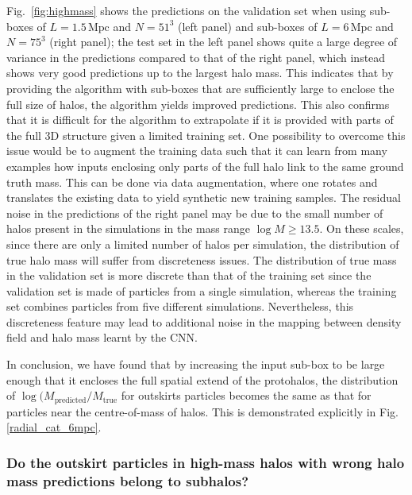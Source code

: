 \documentclass[11pt]{article}
\begin{document}
Fig.~\ref{fig:highmass} shows the predictions on the validation set when using sub-boxes of $L=1.5\, \mathrm{Mpc}$ and $N=51^3$ (left panel) and sub-boxes of $L=6\, \mathrm{Mpc}$ and $N=75^3$ (right panel); the test set in the left panel shows quite a large degree of variance in the predictions compared to that of the right panel, which instead shows very good predictions up to the largest halo mass. This indicates that by providing the algorithm with sub-boxes that are sufficiently large to enclose the full size of halos, the algorithm yields improved predictions. This also confirms that it is difficult for the algorithm to extrapolate if it is provided with parts of the full 3D structure given a limited training set. One possibility to overcome this issue would be to augment the training data such that it can learn from many examples how inputs enclosing only parts of the full halo link to the same ground truth mass. This can be done via data augmentation, where one rotates and translates the existing data to yield synthetic new training samples. The residual noise in the predictions of the right panel may be due to the small number of halos present in the simulations in the mass range $\log M \geq 13.5$. On these scales, since there are only a limited number of halos per simulation, the distribution of true halo mass will suffer from discreteness issues. The distribution of true mass in the validation set is more discrete than that of the training set since the validation set is made of particles from a single simulation, whereas the training set combines particles from five different simulations. Nevertheless, this discreteness feature may lead to additional noise in the mapping between density field and halo mass learnt by the CNN.

In conclusion, we have found that by increasing the input sub-box to be large enough that it encloses the full spatial extend of the protohalos, the distribution of $\log(M_\mathrm{predicted}/M_\mathrm{true}$ for outskirts particles becomes the same as that for particles near the centre-of-mass of halos. This is demonstrated explicitly in Fig.\ref{radial_cat_6mpc}.

\subsubsection*{Do the outskirt particles in high-mass halos with wrong halo mass predictions belong to subhalos?} 
\end{document}
